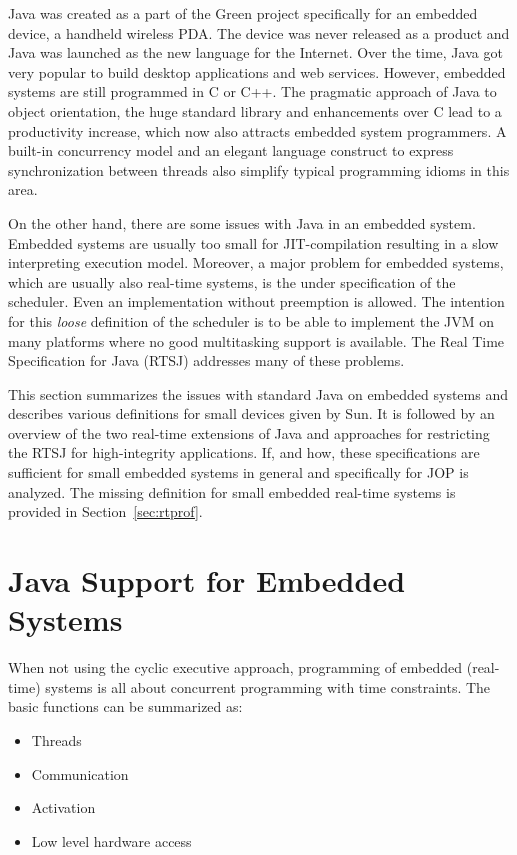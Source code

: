 Java was created as a part of the Green project specifically for an
embedded device, a handheld wireless PDA. The device was never
released as a product and Java was launched as the new language for
the Internet. Over the time, Java got very popular to build desktop
applications and web services. However, embedded systems are still
programmed in C or C++. The pragmatic approach of Java to object
orientation, the huge standard library and enhancements over C lead
to a productivity increase, which now also attracts embedded system
programmers. A built-in concurrency model and an elegant language
construct to express synchronization between threads also simplify
typical programming idioms in this area.

On the other hand, there are some issues with Java in an embedded
system. Embedded systems are usually too small for JIT-compilation
resulting in a slow interpreting execution model. Moreover, a major
problem for embedded systems, which are usually also real-time
systems, is the under specification of the scheduler. Even an
implementation without preemption is allowed. The intention for this
\textit{loose} definition of the scheduler is to be able to
implement the JVM on many platforms where no good multitasking
support is available. The Real Time Specification for Java (RTSJ)
\cite{rtsj}  addresses many of these problems.

This section summarizes the issues with standard Java on embedded
systems and describes various definitions for small devices given by
Sun. It is followed by an overview of the two real-time extensions
of Java and approaches for restricting the RTSJ for high-integrity
applications. If, and how, these specifications are sufficient for
small embedded systems in general and specifically for JOP is
analyzed. The missing definition for small embedded real-time
systems is provided in Section~\ref{sec:rtprof}.

\section{Java Support for Embedded Systems}

When not using the cyclic executive approach, programming of
embedded (real-time) systems is all about concurrent programming
with time constraints. The basic functions can be summarized as:

\begin{itemize}
    \item Threads
    \item Communication
    \item Activation
    \item Low level hardware access
\end{itemize}

